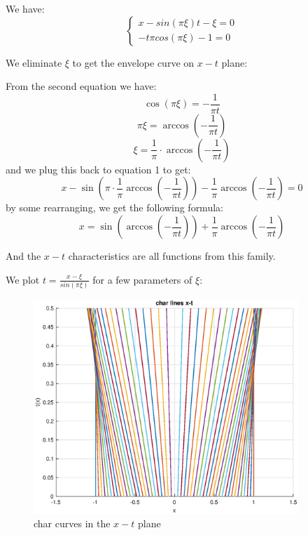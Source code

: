 \documentclass[12pt]{article} %
\newcommand{\1}[1]{\mathds{1}\left[#1\right]}
\begin{document}
We have:
\begin{equation}
\begin{cases}
	x - sin(\pi\xi)t - \xi = 0\\
	-t\pi cos(\pi\xi) - 1 = 0
\end{cases}
\end{equation}

We eliminate $\xi$ to get the envelope curve on $x-t$ plane:

From the second equation we have:
$$
	\cos(\pi\xi) = -\frac{1}{\pi t}
$$
$$
	\pi\xi = \arccos(-\frac{1}{\pi t})
$$
$$
	\xi = \frac{1}{\pi}\cdot\arccos(-\frac{1}{\pi t})
$$ and we plug this back to equation 1 to get:
$$
	x - \sin(\pi\cdot\frac{1}{\pi}\arccos(-\frac{1}{\pi t})) - \frac{1}{\pi}\arccos(-\frac{1}{\pi t}) = 0
$$ by some rearranging, we get the following formula:
\begin{equation}
x = \sin(\arccos(-\frac{1}{\pi t})) + \frac{1}{\pi}\arccos(-\frac{1}{\pi t})
\end{equation}

And the $x-t$ characteristics are all functions from this family.

We plot $t = \frac{x-\xi}{sin(\pi \xi)}$ for a few parameters of $\xi$:

\newpage
\begin{figure}[t]
\includegraphics[width=10cm]{xt_char.eps}
\centering
\caption{char curves in the $x-t$ plane}
\end{figure}
\end{document}
